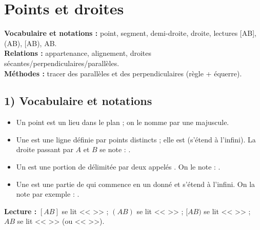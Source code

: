 \chapter{Points et droites}
\label{chap:seq02}

\newcommand{\trou}[1]{\makebox[#1]{\dotfill}}

\begin{objectifsbox}
	\textbf{Vocabulaire et notations :} point, segment, demi-droite, droite, lectures [AB], (AB), [AB), AB.\\
	\textbf{Relations :} appartenance, alignement, droites sécantes/perpendiculaires/parallèles.\\
	\textbf{Méthodes :} tracer des parallèles et des perpendiculaires (règle + équerre).
\end{objectifsbox}

\section*{1) Vocabulaire et notations}
\begin{itemize}
	\item Un point est un lieu dans le plan ; on le nomme par une \trou{5cm} majuscule.
	\item Une \trou{5cm} est une ligne définie par \trou{3cm} points distincts ; elle est \trou{3cm} (s'étend à l'infini).
	La droite passant par $A$ et $B$ se note : \trou{5cm}.
	\item Un \trou{3cm} est une portion de \trou{3cm} délimitée par deux \trou{3cm} appelés \trou{3cm}.
	On le note : \trou{3cm}.
	\item Une \trou{3cm} est une partie de \trou{2.2cm} qui commence en un \trou{3cm} donné et s'étend à l'infini.
	On la note par exemple : \trou{3cm}.
\end{itemize}

\textbf{Lecture :} $[AB]$ se lit << \trou{3cm} >> ; $(AB)$ se lit << \trou{3cm} >> ; $[AB)$ se lit << \trou{3cm} >> ;
$AB$ se lit << \trou{3cm} >> (ou << \trou{3cm} >>).

